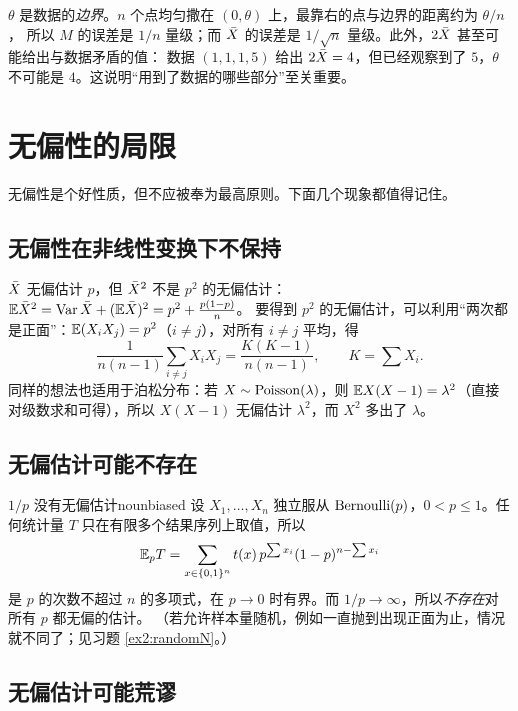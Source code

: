 \begin{intuition}[为什么最大值好得多]
$\theta$ 是数据的\emph{边界}。$n$ 个点均匀撒在 $(0,\theta)$ 上，最靠右的点与边界的距离约为 $\theta/n$，
所以 $M$ 的误差是 $1/n$ 量级；而 $\bar{X}$ 的误差是 $1/\sqrt n$ 量级。此外，$2\bar{X}$ 甚至可能给出与数据矛盾的值：
数据 $(1,1,1,5)$ 给出 $2\bar{X}=4$，但已经观察到了 $5$，$\theta$ 不可能是 $4$。这说明“用到了数据的哪些部分”至关重要。
\end{intuition}

\section{无偏性的局限}

无偏性是个好性质，但不应被奉为最高原则。下面几个现象都值得记住。

\subsection{无偏性在非线性变换下不保持}

$\bar{X}$ 无偏估计 $p$，但 $\bar{X}^2$ 不是 $p^2$ 的无偏估计：
$\mathbb{E}\bar{X}^2=\operatorname{Var}\bar{X}+(\mathbb{E}\bar{X})^2=p^2+\frac{p(1-p)}{n}$。
要得到 $p^2$ 的无偏估计，可以利用“两次都是正面”：$\mathbb{E}(X_iX_j)=p^2$（$i\ne j$），对所有 $i\ne j$ 平均，得
\[
\frac{1}{n(n-1)}\sum_{i\ne j}X_iX_j=\frac{K(K-1)}{n(n-1)},\qquad K=\sum X_i .
\]
同样的想法也适用于泊松分布：若 $X\sim\operatorname{Poisson}(\lambda)$，则 $\mathbb{E} X(X-1)=\lambda^2$（直接对级数求和可得），所以 $X(X-1)$ 无偏估计 $\lambda^2$，而 $X^2$ 多出了 $\lambda$。

\subsection{无偏估计可能不存在}

\begin{example}{\texorpdfstring{$1/p$}{1/p} 没有无偏估计}{nounbiased}
设 $X_1,\dots,X_n$ 独立服从 $\operatorname{Bernoulli}(p)$，$0<p\le1$。任何统计量 $T$ 只在有限多个结果序列上取值，所以
\[
\mathbb{E}_pT=\sum_{x\in\{0,1\}^n}t(x)\,p^{\sum x_i}(1-p)^{n-\sum x_i}
\]
是 $p$ 的次数不超过 $n$ 的多项式，在 $p\to0$ 时有界。而 $1/p\to\infty$，所以\emph{不存在}对所有 $p$ 都无偏的估计。
（若允许样本量随机，例如一直抛到出现正面为止，情况就不同了；见习题 \ref{ex2:randomN}。）
\end{example}

\subsection{无偏估计可能荒谬}

